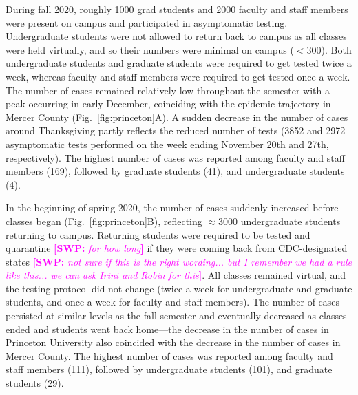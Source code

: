 \documentclass[12pt]{article}
\newcommand{\fref}[1]{Fig.~\ref{fig:#1}}
\newcommand{\comment}[3]{\textcolor{#1}{\textbf{[#2: }\textsl{#3}\textbf{]}}}
\newcommand{\swp}[1]{\comment{magenta}{SWP}{#1}}
\begin{document}
During fall 2020, roughly 1000 grad students and 2000 faculty and staff members were present on campus and participated in asymptomatic testing. 
Undergraduate students were not allowed to return back to campus as all classes were held virtually, and so their numbers were minimal on campus ($<300$).  
Both undergraduate students and graduate students were required to get tested twice a week, whereas faculty and staff members were required to get tested once a week.
The number of cases remained relatively low throughout the semester with a peak occurring in early December, coinciding with the epidemic trajectory in Mercer County (\fref{princeton}A).  
A sudden decrease in the number of cases around Thanksgiving partly reflects the reduced number of tests (3852 and 2972 asymptomatic tests performed on the week ending November 20th and 27th, respectively).
The highest number of cases was reported among faculty and staff members (169), followed by graduate students (41), and undergraduate students (4).

In the beginning of spring 2020, the number of cases suddenly increased before classes began (\fref{princeton}B), reflecting $\approx 3000$ undergraduate students returning to campus.
Returning students were required to be tested and quarantine \swp{for how long} if they were coming back from CDC-designated states \swp{not sure if this is the right wording... but I remember we had a rule like this... we can ask Irini and Robin for this}.
All classes remained virtual, and the testing protocol did not change (twice a week for undergraduate and graduate students, and once a week for faculty and staff members).
The number of cases persisted at similar levels as the fall semester and eventually decreased as classes ended and students went back home---the decrease in the number of cases in Princeton University also coincided with the decrease in the number of cases in Mercer County.
The highest number of cases was reported among faculty and staff members (111), followed by undergraduate students (101), and graduate students (29).
\end{document}
